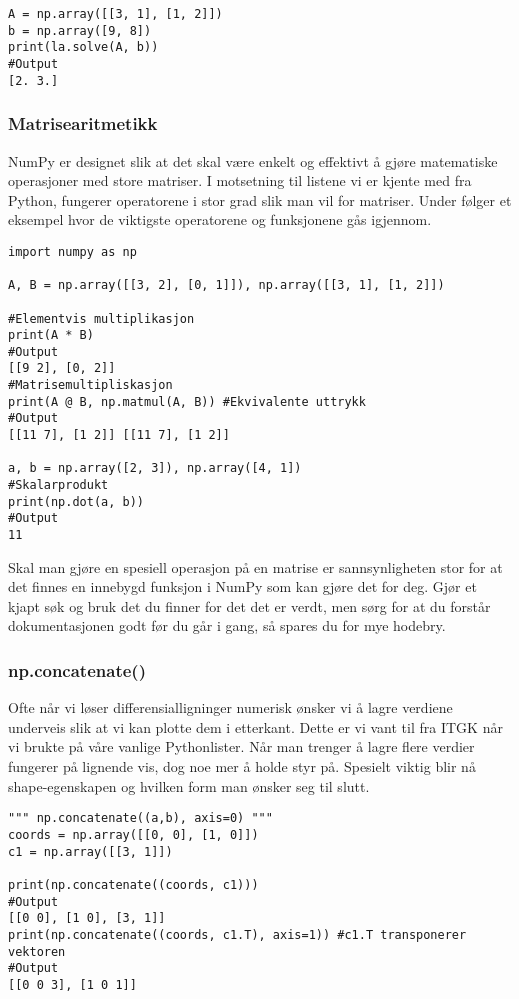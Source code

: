 \documentclass[a4paper,12pt]{article}
\begin{document}
\begin{lstlisting}
A = np.array([[3, 1], [1, 2]])
b = np.array([9, 8])
print(la.solve(A, b))
#Output
[2. 3.]
\end{lstlisting}

\subsubsection{Matrisearitmetikk}
NumPy er designet slik at det skal være enkelt og effektivt å gjøre matematiske operasjoner med store matriser. I motsetning til listene vi er kjente med fra Python, fungerer operatorene i stor grad slik man vil for matriser. Under følger et eksempel hvor de viktigste operatorene og funksjonene gås igjennom.

\begin{lstlisting}
import numpy as np

A, B = np.array([[3, 2], [0, 1]]), np.array([[3, 1], [1, 2]])

#Elementvis multiplikasjon
print(A * B)
#Output
[[9 2], [0, 2]]
#Matrisemultipliskasjon
print(A @ B, np.matmul(A, B)) #Ekvivalente uttrykk
#Output
[[11 7], [1 2]] [[11 7], [1 2]] 

a, b = np.array([2, 3]), np.array([4, 1])
#Skalarprodukt
print(np.dot(a, b))
#Output
11
\end{lstlisting}

\begin{mdframed}[frametitle={Tips!}]
Skal man gjøre en spesiell operasjon på en matrise er sannsynligheten stor for at det finnes en innebygd funksjon i NumPy som kan gjøre det for deg. Gjør et kjapt søk og bruk det du finner for det det er verdt, men sørg for at du forstår dokumentasjonen godt før du går i gang, så spares du for mye hodebry.
\end{mdframed}

\subsubsection{np.concatenate()}
Ofte når vi løser differensialligninger numerisk ønsker vi å lagre verdiene underveis slik at vi kan plotte dem i etterkant. Dette er vi vant til fra ITGK når vi brukte  på våre vanlige Pythonlister. Når man trenger å lagre flere verdier fungerer  på lignende vis, dog noe mer å holde styr på. Spesielt viktig blir nå shape-egenskapen og hvilken form man ønsker seg til slutt. 

\begin{lstlisting}
""" np.concatenate((a,b), axis=0) """
coords = np.array([[0, 0], [1, 0]])
c1 = np.array([[3, 1]])

print(np.concatenate((coords, c1)))
#Output
[[0 0], [1 0], [3, 1]]
print(np.concatenate((coords, c1.T), axis=1)) #c1.T transponerer vektoren
#Output
[[0 0 3], [1 0 1]]
\end{lstlisting}
\end{document}
